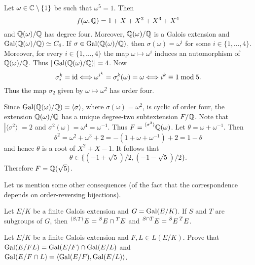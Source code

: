 \begin{example}
    Let $\omega\in\mathbb{C}\setminus\{1\}$ be such that $\omega^5=1$.
    Then 
    \[
    f(\omega,\mathbb{Q})=1+X+X^2+X^3+X^4
    \]
    and $\mathbb{Q}(\omega)/\mathbb{Q}$ has
    degree four. 
    Moreover, $\mathbb{Q}(\omega)/\mathbb{Q}$ is a Galois extension
    and 
    $\operatorname{Gal}(\mathbb{Q}(\omega)/\mathbb{Q})\simeq C_4$. If $\sigma\in \operatorname{Gal}(\mathbb{Q}(\omega)/\mathbb{Q})$,
    then $\sigma(\omega)=\omega^i$ for some $i\in\{1,\dots,4\}$. 
    Moreover, for every $i\in\{1,\dots,4\}$ 
    the map $\omega\mapsto\omega^i$ induces an automorphism
    of $\mathbb{Q}(\omega)/\mathbb{Q}$. Thus $|\operatorname{Gal}(\mathbb{Q}(\omega)/\mathbb{Q})|=4$. Now 
    \[
    \sigma_i^k=\operatorname{id}\Longleftrightarrow
    \omega^{i^k}=\sigma_i^k(\omega)=\omega\Longleftrightarrow
    i^k\equiv1\bmod 5.
    \]
    Thus the map $\sigma_2$ given 
    by $\omega\mapsto\omega^2$ has order four. 
    
    Since $\operatorname{Gal}(\mathbb{Q}(\omega)/\mathbb{Q})=\langle\sigma\rangle$,
    where $\sigma(\omega)=\omega^2$, 
    is cyclic of order four, 
    the extension $\mathbb{Q}(\omega)/\mathbb{Q}$ has a unique degree-two 
    subtextension $F/\mathbb{Q}$. Note that $|\langle\sigma^2\rangle|=2$ 
    and $\sigma^2(\omega)=\omega^4=\omega^{-1}$. Thus 
    $F=\prescript{\langle\sigma^2\rangle}{}{\mathbb{Q}(\omega)}$. Let 
    $\theta=\omega+\omega^{-1}$. Then 
    \[
    \theta^2=\omega^2+\omega^3+2=-(1+\omega+\omega^{-1})+2=1-\theta
    \]
    and hence $\theta$ is a root of $X^2+X-1$. It follows that 
    \[
    \theta\in\{(-1+\sqrt{5})/2,(-1-\sqrt{5})/2\}.
    \]
    Therefore
    $F=\mathbb{Q}(\sqrt{5})$. 
\end{example}

Let us mention some other consequences (of the fact that the correspondence 
depends on order-reversing bijections). 

\begin{exercise}
    Let $E/K$ be a finite Galois extension and $G=\operatorname{Gal}(E/K)$. 
    If $S$ and $T$ are subgroups of $G$, then 
    $\prescript{\langle S,T\rangle}{}{E}=\prescript{S}{}{E}\cap \prescript{T}{}{E}$ and 
    $\prescript{S\cap T}{}{E}=\prescript{S}{}{E}\prescript{T}{}{E}$.
\end{exercise}

\begin{exercise}
Let $E/K$ be a finite Galois extension 
and $F,L\in L(E/K)$. Prove that $\operatorname{Gal}(E/FL)=\operatorname{Gal}(E/F)\cap\operatorname{Gal}(E/L)$ and 
$\operatorname{Gal}(E/F\cap L)=\langle\operatorname{Gal}(E/F),\operatorname{Gal}(E/L)\rangle$.    
\end{exercise}



